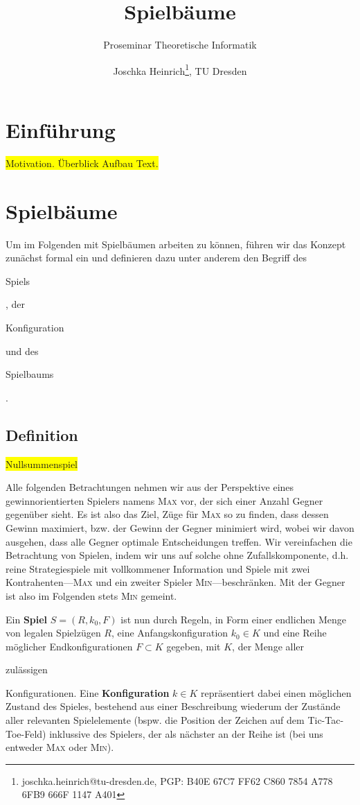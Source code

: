 \documentclass[a4paper,twoside]{scrartcl}
\title{Spielbäume}
\subtitle{Proseminar Theoretische Informatik}
\author{Joschka Heinrich\thanks{joschka.heinrich@tu-dresden.de, PGP: \textsc{B40E 67C7 FF62 C860 7854 A778 6FB9 666F 1147 A401}}, TU Dresden}
\newcommand\e[1]{\begin{em}#1\end{em}}
\newcommand\q[1]{\glqq #1\grqq}
\newcommand\todo[1]{\colorbox{yellow}{#1}}
\begin{document}
\maketitle



\section{Einführung}
\todo{Motivation. Überblick Aufbau Text.}



\section{Spielbäume}
Um im Folgenden mit Spielbäumen arbeiten zu können, führen wir das Konzept zunächst formal ein und definieren dazu unter anderem den Begriff des \e{Spiels}, der \e{Konfiguration} und des \e{Spielbaums}.


\subsection{Definition}

\todo{Nullsummenspiel}

Alle folgenden Betrachtungen nehmen wir aus der Perspektive eines gewinnorientierten Spielers namens \textsc{Max} vor, der sich einer Anzahl Gegner gegenüber sieht. Es ist also das Ziel, Züge für \textsc{Max} so zu finden, dass dessen Gewinn maximiert, bzw. der Gewinn der Gegner minimiert wird, wobei wir davon ausgehen, dass alle Gegner optimale Entscheidungen treffen. Wir vereinfachen die Betrachtung von Spielen, indem wir uns auf solche ohne Zufallskomponente, d.h. reine Strategiespiele mit vollkommener Information und Spiele mit zwei Kontrahenten---\textsc{Max} und ein zweiter Spieler \textsc{Min}---beschränken. Mit \q{der Gegner} ist also im Folgenden stets \textsc{Min} gemeint. 

Ein \textbf{Spiel} $S = (R,k_0,F)$ ist nun durch Regeln, in Form einer endlichen Menge von legalen Spielzügen $R$, eine Anfangskonfiguration $k_0 \in K$ und eine Reihe möglicher Endkonfigurationen $F \subset K$ gegeben, mit $K$, der Menge aller \e{zulässigen} Konfigurationen. Eine \textbf{Konfiguration} $k \in K$ repräsentiert dabei einen möglichen Zustand des Spieles, bestehend aus einer Beschreibung wiederum der Zustände aller relevanten Spielelemente (bspw. die Position der Zeichen auf dem Tic-Tac-Toe-Feld) inklussive des Spielers, der als nächster an der Reihe ist (bei uns entweder \textsc{Max} oder \textsc{Min}).
\end{document}
